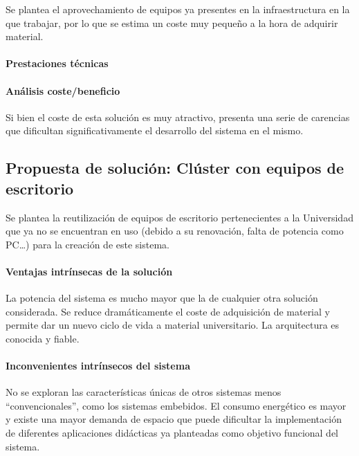 Se plantea el aprovechamiento de equipos ya presentes en la infraestructura en la que trabajar, por lo que se estima un coste muy pequeño a la hora de adquirir material.

\paragraph{Prestaciones técnicas\\}


\paragraph{Análisis coste/beneficio\\}

Si bien el coste de esta solución es muy atractivo, presenta una serie de carencias que dificultan significativamente el desarrollo del sistema en el mismo. 


\subsection{Propuesta de solución: Clúster con equipos de escritorio}

Se plantea la reutilización de equipos de escritorio pertenecientes a la Universidad que ya no se encuentran en uso (debido a su renovación, falta de potencia como PC\dots) para la creación de este sistema.

\paragraph{Ventajas intrínsecas de la solución\\}

La potencia del sistema es mucho mayor que la de cualquier otra solución considerada. Se reduce dramáticamente el coste de adquisición de material y permite dar un nuevo ciclo de vida a material universitario. La arquitectura es conocida y fiable.

\paragraph{Inconvenientes intrínsecos del sistema\\}

No se exploran las características únicas de otros sistemas menos ``convencionales'', como los sistemas embebidos. El consumo energético es mayor y existe una mayor demanda de espacio que puede dificultar la implementación de diferentes aplicaciones didácticas ya planteadas como objetivo funcional del sistema.

